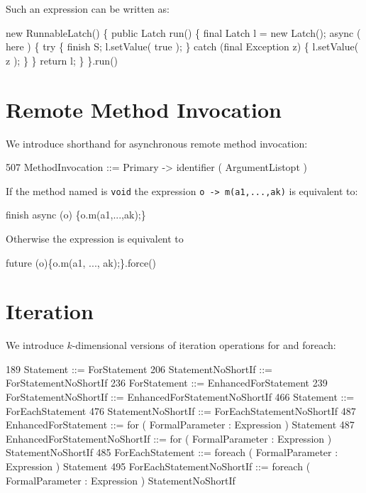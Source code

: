 {{Such an expression can be written as:
\begin{x10}
  new RunnableLatch() \{
      public Latch run() \{
         final Latch l = new Latch();
         async ( here ) \{
            try \{
                finish S;
                l.setValue( true );
            \} catch (final Exception z) \{
                 l.setValue( z );
            \}
         \}
         return l;
      \}
    \}.run()
\end{x10}

\section{Remote Method Invocation}
We introduce shorthand for asynchronous remote method invocation:

\begin{x10}
507   MethodInvocation ::= Primary -> identifier ( ArgumentListopt )
\end{x10}

If the method named is {\tt void} the expression {\tt o -> m(a1,...,ak)}
is equivalent to:
\begin{x10}
 finish async (o) \{o.m(a1,...,ak);\}
\end{x10}

Otherwise the expression is equivalent to
\begin{x10}
 future (o)\{o.m(a1, ..., ak);\}.force()
\end{x10}


\section{Iteration}\label{ForLoop}
\label{ForAllLoop}

We introduce  $k$-dimensional versions of iteration operations {\cf for} and 
{\cf foreach}:

\begin{x10}
189 Statement ::= ForStatement
206 StatementNoShortIf ::= ForStatementNoShortIf
236 ForStatement ::= EnhancedForStatement
239 ForStatementNoShortIf ::= EnhancedForStatementNoShortIf
466 Statement ::= ForEachStatement
476 StatementNoShortIf ::= ForEachStatementNoShortIf
487 EnhancedForStatement ::= for ( FormalParameter : Expression ) Statement
487 EnhancedForStatementNoShortIf ::= 
        for ( FormalParameter : Expression ) StatementNoShortIf
485  ForEachStatement ::= foreach ( FormalParameter : Expression ) Statement
495  ForEachStatementNoShortIf ::= 
        foreach ( FormalParameter : Expression ) StatementNoShortIf
\end{x10}

}}
